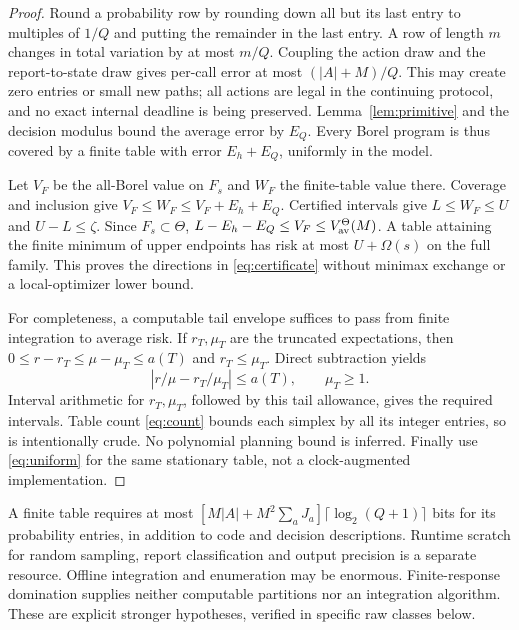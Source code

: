 \begin{proof}
Round a probability row by rounding down all but its last entry to multiples of $1/Q$ and putting the remainder in the last entry. A row of length $m$ changes in total variation by at most $m/Q$. Coupling the action draw and the report-to-state draw gives per-call error at most $(|A|+M)/Q$. This may create zero entries or small new paths; all actions are legal in the continuing protocol, and no exact internal deadline is being preserved. Lemma~\ref{lem:primitive} and the decision modulus bound the average error by $E_Q$. Every Borel program is thus covered by a finite table with error $E_h+E_Q$, uniformly in the model.

Let $V_F$ be the all-Borel value on $F_s$ and $W_F$ the finite-table value there. Coverage and inclusion give $V_F\le W_F\le V_F+E_h+E_Q$. Certified intervals give $L\le W_F\le U$ and $U-L\le\zeta$. Since $F_s\subset\Theta$, $L-E_h-E_Q\le V_F\le V_{\mathrm{av}}^\Theta(M)$. A table attaining the finite minimum of upper endpoints has risk at most $U+\Omega(s)$ on the full family. This proves the directions in \eqref{eq:certificate} without minimax exchange or a local-optimizer lower bound.

For completeness, a computable tail envelope suffices to pass from finite integration to average risk. If $r_T,\mu_T$ are the truncated expectations, then $0\le r-r_T\le\mu-\mu_T\le a(T)$ and $r_T\le\mu_T$. Direct subtraction yields
\[
 |r/\mu-r_T/\mu_T|\le a(T),\qquad \mu_T\ge1.
\]
Interval arithmetic for $r_T,\mu_T$, followed by this tail allowance, gives the required intervals. Table count \eqref{eq:count} bounds each simplex by all its integer entries, so is intentionally crude. No polynomial planning bound is inferred. Finally use \eqref{eq:uniform} for the same stationary table, not a clock-augmented implementation.
\end{proof}

A finite table requires at most
$[M|A|+M^2\sum_aJ_a]\lceil\log_2(Q+1)\rceil$
bits for its probability entries, in addition to code and decision descriptions. Runtime scratch for random sampling, report classification and output precision is a separate resource. Offline integration and enumeration may be enormous. Finite-response domination supplies neither computable partitions nor an integration algorithm. These are explicit stronger hypotheses, verified in specific raw classes below.
